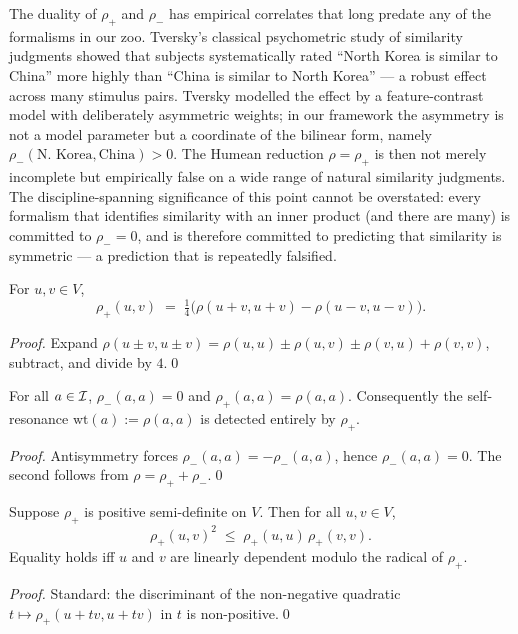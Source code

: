 The duality of $\rho_+$ and $\rho_-$ has empirical correlates that long
predate any of the formalisms in our zoo. Tversky's classical
psychometric study of similarity judgments showed that subjects
systematically rated ``North Korea is similar to China'' more highly than
``China is similar to North Korea'' --- a robust effect across many
stimulus pairs. Tversky modelled the effect by a feature-contrast model
with deliberately asymmetric weights; in our framework the asymmetry is
not a model parameter but a coordinate of the bilinear form, namely
$\rho_-(\text{N.\ Korea},\text{China})>0$. The Humean reduction
$\rho=\rho_+$ is then not merely incomplete but empirically false on a
wide range of natural similarity judgments. The discipline-spanning
significance of this point cannot be overstated: every formalism that
identifies similarity with an inner product (and there are many) is
committed to $\rho_-=0$, and is therefore committed to predicting that
similarity is symmetric --- a prediction that is repeatedly falsified.

\begin{lemma}[Polarization]\label{lem:polarization}
For $u,v\in V$,
\[
\rho_+(u,v) \;=\; \tfrac14\bigl(\rho(u+v,u+v)-\rho(u-v,u-v)\bigr).
\]
\end{lemma}

\begin{proof}
Expand $\rho(u\pm v,u\pm v)=\rho(u,u)\pm\rho(u,v)\pm\rho(v,u)+\rho(v,v)$,
subtract, and divide by $4$.\qed
\end{proof}

\begin{lemma}\label{lem:diag}
For all $a\in\mathcal{I}$, $\rho_-(a,a)=0$ and $\rho_+(a,a)=\rho(a,a)$.
Consequently the self-resonance $\mathrm{wt}(a):=\rho(a,a)$ is detected
entirely by $\rho_+$.
\end{lemma}

\begin{proof}
Antisymmetry forces $\rho_-(a,a)=-\rho_-(a,a)$, hence $\rho_-(a,a)=0$. The
second follows from $\rho=\rho_++\rho_-$.\qed
\end{proof}

\begin{lemma}\label{lem:cs}
Suppose $\rho_+$ is positive semi-definite on $V$. Then for all $u,v\in V$,
\[
\rho_+(u,v)^2 \;\le\; \rho_+(u,u)\,\rho_+(v,v).
\]
Equality holds iff $u$ and $v$ are linearly dependent modulo the radical
of $\rho_+$.
\end{lemma}
\begin{proof}
Standard: the discriminant of the non-negative quadratic
$t\mapsto\rho_+(u+tv,u+tv)$ in $t$ is non-positive.\qed
\end{proof}

